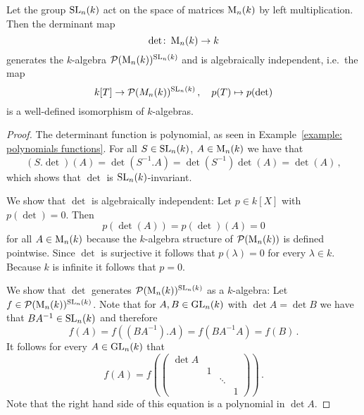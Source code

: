 \begin{theorem}
  Let the group $\operatorname{SL}_n(k)$ act on the space of matrices $\operatorname{M}_n(k)$ by left multiplication.
  Then the derminant map
  \[
            \det
    \colon  \operatorname{M}_n(k)
    \to     k
  \]
  generates the $k$-algebra $\mathcal{P}(\operatorname{M}_n(k))^{\operatorname{SL}_n(k)}$ and is algebraically independent, i.e.\ the map
  \[
            k[T]
    \to     \mathcal{P}(M_n(k))^{\operatorname{SL}_n(k)} \,,
    \quad   p(T)
    \mapsto p(\det)
  \]
  is a well-defined isomorphism of $k$-algebras.
\end{theorem}
\begin{proof}
  The determinant function is polynomial, as seen in Example~\ref{example: polynomials functions}.
  For all $S \in \operatorname{SL}_n(k)$, $A \in \operatorname{M}_n(k)$ we have that
  \[
      (S.\det)(A)
    = \det\left(S^{-1}.A\right)
    = \det\left( S^{-1} \right) \det(A)
    = \det(A) \,,
  \]
  which shows that $\det$ is $\operatorname{SL}_n(k)$-invariant.
  
  We show that $\det$ is algebraically independent:
  Let $p \in k[X]$ with $p(\det) = 0$.
  Then
  \[
      p(\det(A))
    = p(\det)(A)
    = 0
  \]
  for all $A \in \operatorname{M}_n(k)$ because the $k$-algebra structure of $\mathcal{P}(\operatorname{M}_n(k))$ is defined pointwise.
  Since $\det$ is surjective it follows that $p(\lambda) = 0$ for every $\lambda \in k$.
  Because $k$ is infinite it follows that $p = 0$.
  
  We show that $\det$ generates $\mathcal{P}(\operatorname{M}_n(k))^{\operatorname{SL}_n(k)}$ as a $k$-algebra:
  Let $f \in \mathcal{P}(\operatorname{M}_n(k))^{\operatorname{SL}_n(k)}$.
  Note that for $A, B \in \operatorname{GL}_n(k)$ with $\det A = \det B$ we have that $B A^{-1} \in \operatorname{SL}_n(k)$ and therefore
  \[
      f(A)
    = f\left( (BA^{-1}).A \right)
    = f(B A^{-1} A)
    = f(B) \,.
  \]
  It follows for every $A \in \operatorname{GL}_n(k)$ that
  \begin{equation}
    \label{equation: reduction for GLn}
      f(A)
    = f\left(
        \begin{pmatrix}
          \det A  &   &         &   \\
                  & 1 &         &   \\
                  &   & \ddots  &   \\
                  &   &         & 1
        \end{pmatrix}
      \right) \,.
  \end{equation}
  Note that the right hand side of this equation is a polynomial in $\det A$.
  

\end{proof}
